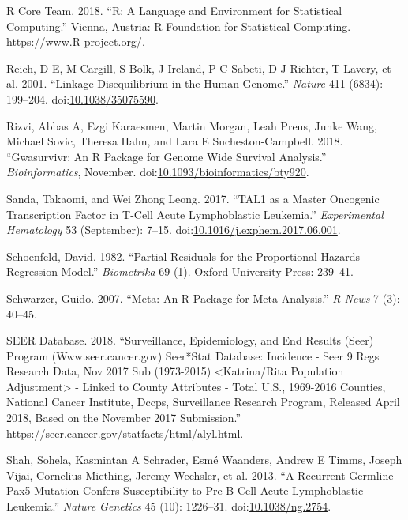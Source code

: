 \documentclass[]{DissertateOSU}
\begin{document}
\hypertarget{ref-r_core}{}
R Core Team. 2018. ``R: A Language and Environment for Statistical
Computing.'' Vienna, Austria: R Foundation for Statistical Computing.
\url{https://www.R-project.org/}.

\hypertarget{ref-Reich_2001}{}
Reich, D E, M Cargill, S Bolk, J Ireland, P C Sabeti, D J Richter, T
Lavery, et al. 2001. ``Linkage Disequilibrium in the Human Genome.''
\emph{Nature} 411 (6834): 199--204.
doi:\href{https://doi.org/10.1038/35075590}{10.1038/35075590}.

\hypertarget{ref-Rizvi_2018}{}
Rizvi, Abbas A, Ezgi Karaesmen, Martin Morgan, Leah Preus, Junke Wang,
Michael Sovic, Theresa Hahn, and Lara E Sucheston-Campbell. 2018.
``Gwasurvivr: An R Package for Genome Wide Survival Analysis.''
\emph{Bioinformatics}, November.
doi:\href{https://doi.org/10.1093/bioinformatics/bty920}{10.1093/bioinformatics/bty920}.

\hypertarget{ref-sanda_2017}{}
Sanda, Takaomi, and Wei Zhong Leong. 2017. ``TAL1 as a Master Oncogenic
Transcription Factor in T-Cell Acute Lymphoblastic Leukemia.''
\emph{Experimental Hematology} 53 (September): 7--15.
doi:\href{https://doi.org/10.1016/j.exphem.2017.06.001}{10.1016/j.exphem.2017.06.001}.

\hypertarget{ref-schoenfeld1982}{}
Schoenfeld, David. 1982. ``Partial Residuals for the Proportional
Hazards Regression Model.'' \emph{Biometrika} 69 (1). Oxford University
Press: 239--41.

\hypertarget{ref-Schwarzer_2007}{}
Schwarzer, Guido. 2007. ``Meta: An R Package for Meta-Analysis.''
\emph{R News} 7 (3): 40--45.

\hypertarget{ref-seer}{}
SEER Database. 2018. ``Surveillance, Epidemiology, and End Results
(Seer) Program (Www.seer.cancer.gov) Seer*Stat Database: Incidence -
Seer 9 Regs Research Data, Nov 2017 Sub (1973-2015)
\textless{}Katrina/Rita Population Adjustment\textgreater{} - Linked to
County Attributes - Total U.S., 1969-2016 Counties, National Cancer
Institute, Dccps, Surveillance Research Program, Released April 2018,
Based on the November 2017 Submission.''
\url{https://seer.cancer.gov/statfacts/html/alyl.html}.

\hypertarget{ref-shah_2013}{}
Shah, Sohela, Kasmintan A Schrader, Esmé Waanders, Andrew E Timms,
Joseph Vijai, Cornelius Miething, Jeremy Wechsler, et al. 2013. ``A
Recurrent Germline Pax5 Mutation Confers Susceptibility to Pre-B Cell
Acute Lymphoblastic Leukemia.'' \emph{Nature Genetics} 45 (10):
1226--31. doi:\href{https://doi.org/10.1038/ng.2754}{10.1038/ng.2754}.
\end{document}
